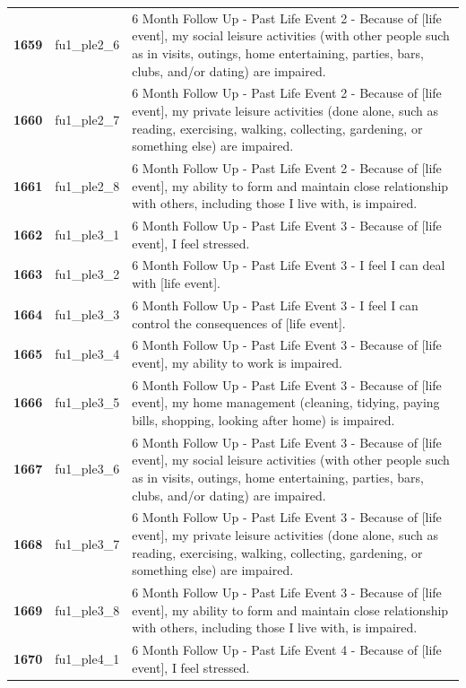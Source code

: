 \documentclass[
  letterpaper,
  DIV=11,
  numbers=noendperiod]{scrartcl}
\begin{document}
\begin{longtable}[t]{>{}cll}
\textbf{1659} & fu1\_ple2\_6 & 6 Month Follow Up - Past Life Event 2 - Because of [life event], my social leisure activities (with other people such as in visits, outings, home entertaining, parties, bars, clubs, and/or dating) are impaired.\\
\textbf{1660} & fu1\_ple2\_7 & 6 Month Follow Up - Past Life Event 2 - Because of [life event], my private leisure activities (done alone, such as reading, exercising, walking, collecting, gardening, or something else) are impaired.\\
\addlinespace
\textbf{1661} & fu1\_ple2\_8 & 6 Month Follow Up - Past Life Event 2 - Because of [life event], my ability to form and maintain close relationship with others, including those I live with, is impaired.\\
\textbf{1662} & fu1\_ple3\_1 & 6 Month Follow Up - Past Life Event 3 - Because of [life event], I feel stressed.\\
\textbf{1663} & fu1\_ple3\_2 & 6 Month Follow Up - Past Life Event 3 - I feel I can deal with [life event].\\
\textbf{1664} & fu1\_ple3\_3 & 6 Month Follow Up - Past Life Event 3 - I feel I can control the consequences of [life event].\\
\textbf{1665} & fu1\_ple3\_4 & 6 Month Follow Up - Past Life Event 3 - Because of [life event], my ability to work is impaired.\\
\addlinespace
\textbf{1666} & fu1\_ple3\_5 & 6 Month Follow Up - Past Life Event 3 - Because of [life event], my home management (cleaning, tidying, paying bills, shopping, looking after home)  is impaired.\\
\textbf{1667} & fu1\_ple3\_6 & 6 Month Follow Up - Past Life Event 3 - Because of [life event], my social leisure activities (with other people such as in visits, outings, home entertaining, parties, bars, clubs, and/or dating) are impaired.\\
\textbf{1668} & fu1\_ple3\_7 & 6 Month Follow Up - Past Life Event 3 - Because of [life event], my private leisure activities (done alone, such as reading, exercising, walking, collecting, gardening, or something else) are impaired.\\
\textbf{1669} & fu1\_ple3\_8 & 6 Month Follow Up - Past Life Event 3 - Because of [life event], my ability to form and maintain close relationship with others, including those I live with, is impaired.\\
\textbf{1670} & fu1\_ple4\_1 & 6 Month Follow Up - Past Life Event 4 - Because of [life event], I feel stressed.\\

\end{longtable}
\end{document}
